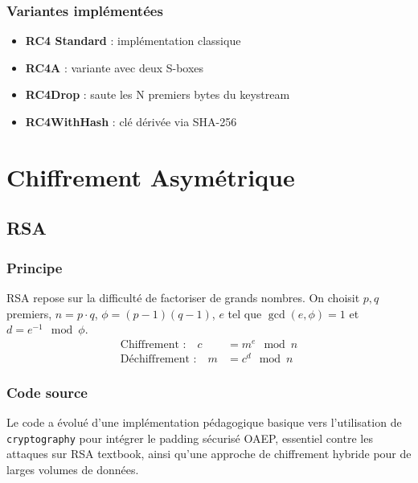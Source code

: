 \documentclass[12pt,a4paper]{report}
\begin{document}
\subsection{Variantes implémentées}
\begin{itemize}
    \item \textbf{RC4 Standard} : implémentation classique
    \item \textbf{RC4A} : variante avec deux S-boxes
    \item \textbf{RC4Drop} : saute les N premiers bytes du keystream
    \item \textbf{RC4WithHash} : clé dérivée via SHA-256
\end{itemize}

\chapter{Chiffrement Asymétrique}

\section{RSA}

\subsection{Principe}
RSA repose sur la difficulté de factoriser de grands nombres. On choisit $p, q$ premiers, $n = p \cdot q$, $\phi = (p-1)(q-1)$, $e$ tel que $\gcd(e, \phi) = 1$ et $d = e^{-1} \mod \phi$.
\begin{align}
\text{Chiffrement :} \quad c &= m^e \mod n \\
\text{Déchiffrement :} \quad m &= c^d \mod n
\end{align}

\subsection{Code source}
Le code a évolué d'une implémentation pédagogique basique vers l'utilisation de \texttt{cryptography} pour intégrer le padding sécurisé OAEP, essentiel contre les attaques sur RSA textbook, ainsi qu'une approche de chiffrement hybride pour de larges volumes de données.
\end{document}
